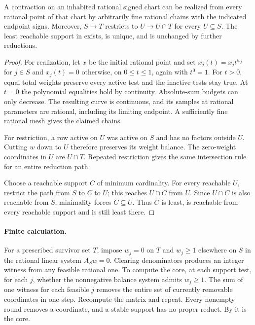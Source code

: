 \begin{lemma}\label{lem:contraction}
A contraction on an inhabited rational signed chart can be realized
from every rational point of that chart by arbitrarily fine rational
chains with the indicated endpoint signs. Moreover, \(S\to T\)
restricts to \(U\to U\cap T\) for every \(U\subseteq S\).
The least reachable support in  exists, is unique,
and is unchanged by further reductions.
\end{lemma}
\begin{proof}
For realization, let \(x\) be the initial rational point and set
\(x_j(t)=x_jt^{w_j}\) for \(j\in S\) and \(x_j(t)=0\) otherwise, on
\(0\le t\le1\), again with \(t^0=1\). For \(t>0\), equal total weights
preserve every active test and the inactive tests stay true. At \(t=0\)
the polynomial equalities hold by continuity. Absolute-sum budgets
can only decrease. The resulting curve is continuous, and its samples at
rational parameters are rational, including its limiting endpoint.
A sufficiently fine rational mesh gives the claimed chains.

For restriction, a row active on \(U\) was active on \(S\) and has no
factors outside \(U\). Cutting \(w\) down to \(U\) therefore preserves its
weight balance. The zero-weight coordinates in \(U\) are \(U\cap T\).
Repeated restriction gives the same intersection rule for an entire
reduction path.

Choose a reachable support \(C\) of minimum cardinality. For every reachable
\(U\), restrict the path from \(S\) to \(C\) to \(U\); this reaches
\(U\cap C\) from \(U\). Since \(U\cap C\) is also reachable from \(S\),
minimality forces \(C\subseteq U\). Thus \(C\) is least, is reachable from
every reachable support and is still least there.
\end{proof}

\paragraph{Finite calculation.}
For a prescribed survivor set \(T\), impose \(w_j=0\) on \(T\) and
\(w_j\ge1\) elsewhere on \(S\) in the rational linear system \(A_Sw=0\).
Clearing denominators produces an integer witness from any feasible
rational one. To compute the core, at each support test, for each \(j\),
whether the nonnegative balance system admits \(w_j\ge1\).
The sum of one witness for each feasible \(j\) removes the entire set of
currently removable coordinates in one step. Recompute the matrix and
repeat. Every nonempty round removes a coordinate, and a stable support
has no proper reduct. By  it is the core.

